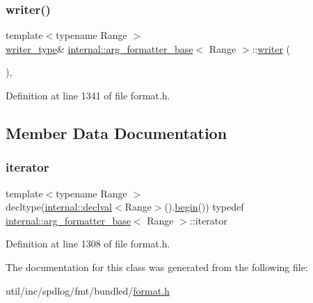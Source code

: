 \subsubsection{\texorpdfstring{writer()}{writer()}}
{\footnotesize\ttfamily template$<$typename Range $>$ \\
\hyperlink{classbasic__writer}{writer\+\_\+type}\& \hyperlink{classinternal_1_1arg__formatter__base}{internal\+::arg\+\_\+formatter\+\_\+base}$<$ Range $>$\+::\hyperlink{format_8h_a67c42c49f4b855aef779fce445a884bf}{writer} (\begin{DoxyParamCaption}{ }\end{DoxyParamCaption})\hspace{0.3cm}{\ttfamily [inline]}, {\ttfamily [protected]}}



Definition at line 1341 of file format.\+h.



\subsection{Member Data Documentation}
\mbox{\label{classinternal_1_1arg__formatter__base_a87622fdc9716fee6a6de2ae496e3a54f}} 
\subsubsection{\texorpdfstring{iterator}{iterator}}
{\footnotesize\ttfamily template$<$typename Range $>$ \\
decltype(\hyperlink{namespaceinternal_a5f61aadb1d6afc8b79ef7ea57c39eafc}{internal\+::declval}$<$Range$>$().\hyperlink{namespaceinternal_a265f36d9dee68d3f44381347ef2fd5cb}{begin}()) typedef \hyperlink{classinternal_1_1arg__formatter__base}{internal\+::arg\+\_\+formatter\+\_\+base}$<$ Range $>$\+::iterator}



Definition at line 1308 of file format.\+h.



The documentation for this class was generated from the following file\+:\begin{DoxyCompactItemize}
\item 
util/inc/spdlog/fmt/bundled/\hyperlink{format_8h}{format.\+h}\end{DoxyCompactItemize}
